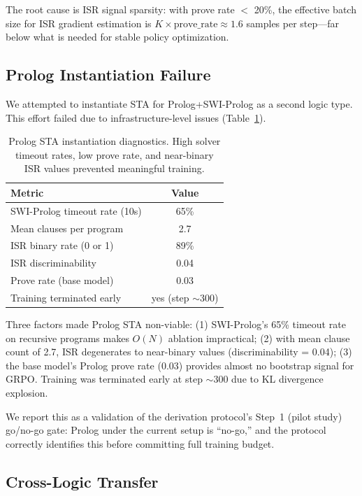 \documentclass[11pt,a4paper]{article}
\begin{document}
The root cause is ISR signal sparsity: with prove rate $<$ 20\%, the effective batch size for ISR gradient estimation is $K \times \text{prove\_rate} \approx 1.6$ samples per step---far below what is needed for stable policy optimization.

\subsection{Prolog Instantiation Failure}
\label{sec:prolog}

We attempted to instantiate STA for Prolog+SWI-Prolog as a second logic type.
This effort failed due to infrastructure-level issues (Table~\ref{tab:prolog}).

\begin{table}[t]
\centering
\small
\begin{tabular}{lc}
\toprule
\textbf{Metric} & \textbf{Value} \\
\midrule
SWI-Prolog timeout rate (10s) & 65\% \\
Mean clauses per program & 2.7 \\
ISR binary rate (0 or 1) & 89\% \\
ISR discriminability & 0.04 \\
Prove rate (base model) & 0.03 \\
Training terminated early & yes (step $\sim$300) \\
\bottomrule
\end{tabular}
\caption{Prolog STA instantiation diagnostics. High solver timeout rates, low prove rate, and near-binary ISR values prevented meaningful training.}
\label{tab:prolog}
\end{table}

Three factors made Prolog STA non-viable: (1) SWI-Prolog's 65\% timeout rate on recursive programs makes $O(N)$ ablation impractical; (2) with mean clause count of 2.7, ISR degenerates to near-binary values (discriminability = 0.04); (3) the base model's Prolog prove rate (0.03) provides almost no bootstrap signal for GRPO.
Training was terminated early at step $\sim$300 due to KL divergence explosion.

We report this as a validation of the derivation protocol's Step~1 (pilot study) go/no-go gate: Prolog under the current setup is ``no-go,'' and the protocol correctly identifies this before committing full training budget.

\subsection{Cross-Logic Transfer}
\label{sec:transfer}
\end{document}
